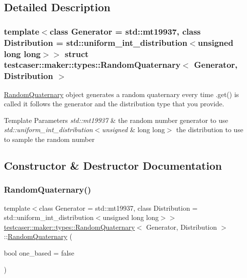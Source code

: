 \subsection{Detailed Description}
\subsubsection*{template$<$class Generator = std\+::mt19937, class Distribution = std\+::uniform\+\_\+int\+\_\+distribution$<$unsigned long long$>$$>$\newline
struct testcaser\+::maker\+::types\+::\+Random\+Quaternary$<$ Generator, Distribution $>$}

\mbox{\hyperlink{structtestcaser_1_1maker_1_1types_1_1RandomQuaternary}{Random\+Quaternary}} object generates a random quaternary every time .get() is called it follows the generator and the distribution type that you provide. 


\begin{DoxyTemplParams}{Template Parameters}
{\em std\+::mt19937} & the random number generator to use \\
\hline
{\em std\+::uniform\+\_\+int\+\_\+distribution$<$unsigned} & long long$>$ the distribution to use to sample the random number \\
\hline
\end{DoxyTemplParams}


\subsection{Constructor \& Destructor Documentation}
\mbox{\label{structtestcaser_1_1maker_1_1types_1_1RandomQuaternary_a8d299dc157ab77fd89f5aba347e2e806}} 
\subsubsection{\texorpdfstring{RandomQuaternary()}{RandomQuaternary()}}
{\footnotesize\ttfamily template$<$class Generator = std\+::mt19937, class Distribution = std\+::uniform\+\_\+int\+\_\+distribution$<$unsigned long long$>$$>$ \\
\mbox{\hyperlink{structtestcaser_1_1maker_1_1types_1_1RandomQuaternary}{testcaser\+::maker\+::types\+::\+Random\+Quaternary}}$<$ Generator, Distribution $>$\+::\mbox{\hyperlink{structtestcaser_1_1maker_1_1types_1_1RandomQuaternary}{Random\+Quaternary}} (\begin{DoxyParamCaption}\item[{bool}]{one\+\_\+based = {\ttfamily false} }\end{DoxyParamCaption})\hspace{0.3cm}{\ttfamily [inline]}}



